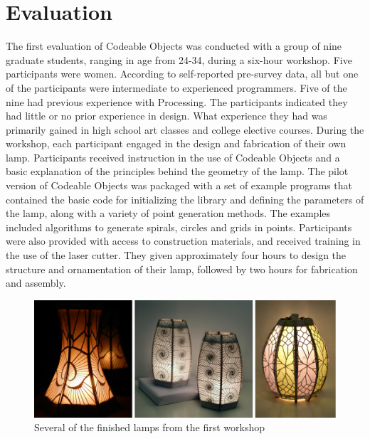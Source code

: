 \section{Evaluation}
The first evaluation of Codeable Objects was conducted with a group of nine graduate students, ranging in age from 24-34, during a six-hour workshop. Five participants were women.  According to self-reported pre-survey data, all but one of the participants were intermediate to experienced programmers. Five of the nine had previous experience with Processing. The participants indicated they had little or no prior experience in design.  What experience they had was primarily gained in high school art classes and college elective courses. During the workshop, each participant engaged in the design and fabrication of their own lamp. Participants received instruction in the use of Codeable Objects and a basic explanation of the principles behind the geometry of the lamp. The pilot version of Codeable Objects was packaged with a set of example programs that contained the basic code for initializing the library and defining the parameters of the lamp, along with a variety of point generation methods. The examples included algorithms to generate spirals, circles and grids in points. Participants were also provided with access to construction materials, and received training in the use of the laser cutter. They given approximately four hours to design the structure and ornamentation of their lamp, followed by two hours for fabrication and assembly.

\begin{center}
\begin{figure}[h!]
\includegraphics[width=\columnwidth]{images/finished_lamps2.png}
\caption{Several of the finished lamps from the first workshop}
\label{fig:finished_lamps}
\end{figure}
\end{center}
\vspace{-20pt}

